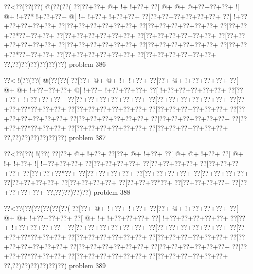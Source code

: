 \vbox{\vbox{\goo
\0??<\0??(\0??(\0??(\- @(\0??(\0??(
\0??[\0??+\0??+\- @+\- !+\- !+\0??+
\0??[\- @+\- @+\- @+\0??+\0??+\0??+
\- ![\- @+\- !+\0??*\- !+\0??+\0??+
\- @[\- !+\- !+\0??+\- !+\0??+\0??+
\0??[\0??+\0??+\0??+\0??+\0??+\0??+
\0??[\- !+\0??+\0??+\0??+\0??+\0??+
\0??[\0??+\0??+\0??+\0??+\0??+\0??+
\0??[\0??+\0??+\0??+\0??+\0??+\0??+
\0??[\0??+\0??+\0??*\0??+\0??+\0??+
\0??[\0??+\0??+\0??+\0??+\0??+\0??+
\0??[\0??+\0??+\0??+\0??+\0??+\0??+
\0??[\0??+\0??+\0??+\0??+\0??+\0??+
\0??[\0??+\0??+\0??+\0??+\0??+\0??+
\0??[\0??+\0??+\0??+\0??+\0??+\0??+
\0??[\0??+\0??+\0??*\0??+\0??+\0??+
\0??[\0??+\0??+\0??+\0??+\0??+\0??+
\0??[\0??+\0??+\0??+\0??+\0??+\0??+
\0??,\0??)\0??)\0??)\0??)\0??)\0??)
}
\hfil problem 386\hfil\break
}

\vbox{\vbox{\goo
\0??<\- !(\0??(\0??(\- @(\0??(\0??(
\0??[\0??+\- @+\- @+\- !+\- !+\0??+
\0??[\0??+\- @+\- !+\0??+\0??+\0??+
\0??[\- @+\- @+\- !+\0??+\0??+\0??+
\- @[\- !+\0??+\- !+\0??+\0??+\0??+
\0??[\- !+\0??+\0??+\0??+\0??+\0??+
\0??[\0??+\0??+\- !+\0??+\0??+\0??+
\0??[\0??+\0??+\0??+\0??+\0??+\0??+
\0??[\0??+\0??+\0??+\0??+\0??+\0??+
\0??[\0??+\0??+\0??*\0??+\0??+\0??+
\0??[\0??+\0??+\0??+\0??+\0??+\0??+
\0??[\0??+\0??+\0??+\0??+\0??+\0??+
\0??[\0??+\0??+\0??+\0??+\0??+\0??+
\0??[\0??+\0??+\0??+\0??+\0??+\0??+
\0??[\0??+\0??+\0??+\0??+\0??+\0??+
\0??[\0??+\0??+\0??*\0??+\0??+\0??+
\0??[\0??+\0??+\0??+\0??+\0??+\0??+
\0??[\0??+\0??+\0??+\0??+\0??+\0??+
\0??,\0??)\0??)\0??)\0??)\0??)\0??)
}
\hfil problem 387\hfil\break
}

\vbox{\vbox{\goo
\0??<\0??(\0??(\- !(\0??(
\0??[\0??+\- @+\- !+\0??+
\0??[\0??+\- @+\- !+\0??+
\0??[\- @+\- @+\- !+\0??+
\0??[\- @+\- !+\- !+\0??+
\- ![\- !+\0??+\0??+\0??+
\0??[\0??+\0??+\0??+\0??+
\0??[\0??+\0??+\0??+\0??+
\0??[\0??+\0??+\0??+\0??+
\0??[\0??+\0??+\0??*\0??+
\0??[\0??+\0??+\0??+\0??+
\0??[\0??+\0??+\0??+\0??+
\0??[\0??+\0??+\0??+\0??+
\0??[\0??+\0??+\0??+\0??+
\0??[\0??+\0??+\0??+\0??+
\0??[\0??+\0??+\0??*\0??+
\0??[\0??+\0??+\0??+\0??+
\0??[\0??+\0??+\0??+\0??+
\0??,\0??)\0??)\0??)\0??)
}
\hfil problem 388\hfil\break
}

\vbox{\vbox{\goo
\0??<\0??(\0??(\0??(\0??(\0??(\0??(
\0??[\0??+\- @+\- !+\0??+\- !+\0??+
\0??[\0??+\- @+\- !+\0??+\0??+\0??+
\0??[\- @+\- @+\- !+\0??+\0??+\0??+
\0??[\- @+\- !+\- !+\0??+\0??+\0??+
\0??[\- !+\0??+\0??+\0??+\0??+\0??+
\0??[\0??+\- !+\0??+\0??+\0??+\0??+
\0??[\0??+\0??+\0??+\0??+\0??+\0??+
\0??[\0??+\0??+\0??+\0??+\0??+\0??+
\0??[\0??+\0??+\0??*\0??+\0??+\0??+
\0??[\0??+\0??+\0??+\0??+\0??+\0??+
\0??[\0??+\0??+\0??+\0??+\0??+\0??+
\0??[\0??+\0??+\0??+\0??+\0??+\0??+
\0??[\0??+\0??+\0??+\0??+\0??+\0??+
\0??[\0??+\0??+\0??+\0??+\0??+\0??+
\0??[\0??+\0??+\0??*\0??+\0??+\0??+
\0??[\0??+\0??+\0??+\0??+\0??+\0??+
\0??[\0??+\0??+\0??+\0??+\0??+\0??+
\0??,\0??)\0??)\0??)\0??)\0??)\0??)
}
\hfil problem 389\hfil\break
}

